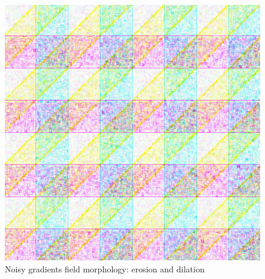 \documentclass[11pt,twoside,english,a4paper]{article}
\begin{document}
\begin{figure}[ht!]
\centering
\includegraphics[width=0.618\columnwidth]{nsquaregm}
\caption[]{Noisy gradients field morphology: erosion and dilation}
\label{nsquaregm}
\end{figure}
\end{document}
